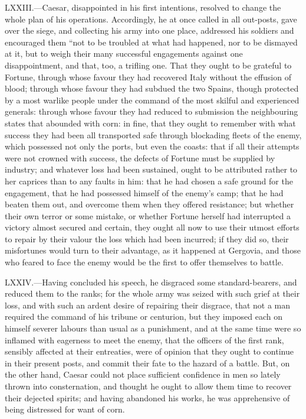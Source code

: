 LXXIII.—Caesar, disappointed in his first intentions, resolved to
change the whole plan of his operations. Accordingly, he at once called
in all out-posts, gave over the siege, and collecting his army into one
place, addressed his soldiers and encouraged them ``not to be troubled at
what had happened, nor to be dismayed at it, but to weigh their many
successful engagements against one disappointment, and that, too, a
trifling one. That they ought to be grateful to Fortune, through whose
favour they had recovered Italy without the effusion of blood; through
whose favour they had subdued the two Spains, though protected by a most
warlike people under the command of the most skilful and experienced
generals: through whose favour they had reduced to submission the
neighbouring states that abounded with corn: in fine, that they ought to
remember with what success they had been all transported safe through
blockading fleets of the enemy, which possessed not only the ports, but
even the coasts: that if all their attempts were not crowned with
success, the defects of Fortune must be supplied by industry; and
whatever loss had been sustained, ought to be attributed rather to her
caprices than to any faults in him: that he had chosen a safe ground for
the engagement, that he had possessed himself of the enemy's camp; that
he had beaten them out, and overcome them when they offered resistance;
but whether their own terror or some mistake, or whether Fortune herself
had interrupted a victory almost secured and certain, they ought all now
to use their utmost efforts to repair by their valour the loss which had
been incurred; if they did so, their misfortunes would turn to their
advantage, as it happened at Gergovia, and those who feared to face the
enemy would be the first to offer themselves to battle.

LXXIV.—Having concluded his speech, he disgraced some standard-bearers,
and reduced them to the ranks; for the whole army was seized with such
grief at their loss, and with such an ardent desire of repairing their
disgrace, that not a man required the command of his tribune or
centurion, but they imposed each on himself severer labours than usual
as a punishment, and at the same time were so inflamed with eagerness to
meet the enemy, that the officers of the first rank, sensibly affected
at their entreaties, were of opinion that they ought to continue in
their present posts, and commit their fate to the hazard of a battle.
But, on the other hand, Caesar could not place sufficient confidence in
men so lately thrown into consternation, and thought he ought to allow
them time to recover their dejected spirits; and having abandoned his
works, he was apprehensive of being distressed for want of corn.


